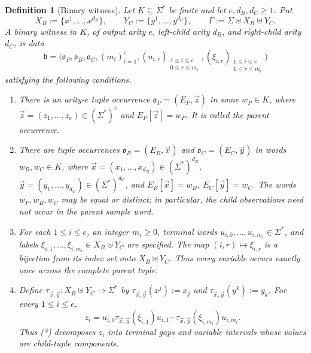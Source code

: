 \documentclass[11pt,a4paper]{article}
\newtheorem{definition}[theorem]{Definition}
\theoremstyle{remark}
\newcommand{\tuple}[1]{\vec{#1}}
\begin{document}
\begin{definition}[Binary witness]
\label{def:binary-witness}
Let \(K\subseteq\Sigma^*\) be finite and let \(e,d_B,d_C\ge1\).  Put
\[
  X_B:=\{x^1,\ldots,x^{d_B}\},\qquad
  Y_C:=\{y^1,\ldots,y^{d_C}\},\qquad
  \Gamma:=\Sigma\uplus X_B\uplus Y_C.
\]
A \emph{binary witness} in \(K\), of output arity \(e\), left-child arity
\(d_B\), and right-child arity \(d_C\), is data
\[
  \mathfrak b=\bigl(
    \mathfrak o_P,\mathfrak o_B,\mathfrak o_C,(m_i)_{i=1}^e,
    (u_{i,r})_{\substack{1\le i\le e\\0\le r\le m_i}},
    (\xi_{i,r})_{\substack{1\le i\le e\\1\le r\le m_i}}
  \bigr)
\]
satisfying the following conditions.
\begin{enumerate}[label=(\roman*),leftmargin=*]
\item There is an arity-\(e\) tuple occurrence
      \(\mathfrak o_P=(E_P,\tuple z)\) in some \(w_P\in K\), where
      \(\tuple z=(z_1,\ldots,z_e)\in(\Sigma^*)^e\) and
      \(E_P[\tuple z]=w_P\).  It is called the \emph{parent occurrence}.

\item There are tuple occurrences
      \(\mathfrak o_B=(E_B,\tuple x)\) and
      \(\mathfrak o_C=(E_C,\tuple y)\) in words \(w_B,w_C\in K\), where
      \(\tuple x=(x_1,\ldots,x_{d_B})\in(\Sigma^*)^{d_B}\),
      \(\tuple y=(y_1,\ldots,y_{d_C})\in(\Sigma^*)^{d_C}\), and
      \(E_B[\tuple x]=w_B\), \(E_C[\tuple y]=w_C\).  The words
      \(w_P,w_B,w_C\) may be equal or distinct; in particular, the child
      observations need not occur in the parent sample word.

\item For each \(1\le i\le e\), an integer \(m_i\ge0\), terminal words
      \(u_{i,0},\ldots,u_{i,m_i}\in\Sigma^*\), and labels
      \(\xi_{i,1},\ldots,\xi_{i,m_i}\in X_B\uplus Y_C\) are specified.
      The map \((i,r)\mapsto\xi_{i,r}\) is a bijection from its index set
      onto \(X_B\uplus Y_C\).  Thus every variable occurs exactly once across
      the complete parent tuple.

\item Define \(\tau_{\tuple x,\tuple y}:X_B\uplus Y_C\to\Sigma^*\) by
      \(\tau_{\tuple x,\tuple y}(x^j):=x_j\) and
      \(\tau_{\tuple x,\tuple y}(y^k):=y_k\).  For every \(1\le i\le e\),
      \[
        z_i=u_{i,0}\tau_{\tuple x,\tuple y}(\xi_{i,1})u_{i,1}\cdots
        \tau_{\tuple x,\tuple y}(\xi_{i,m_i})u_{i,m_i}.
        \tag{*}
      \]
      Thus \textup{(*)} decomposes \(z_i\) into terminal gaps and variable
      intervals whose values are child-tuple components.


\end{enumerate}
\end{definition}
\end{document}
